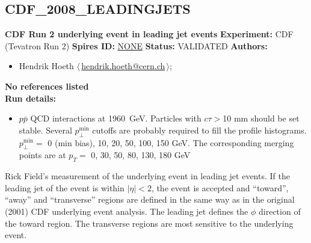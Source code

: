 \subsection{CDF\_2008\_LEADINGJETS}
\textbf{CDF Run 2 underlying event in leading jet events}\newline
\textbf{Experiment:} CDF (Tevatron Run 2) \newline
\textbf{Spires ID:} \href{http://www.slac.stanford.edu/spires/find/hep/www?rawcmd=key+NONE}{NONE}\newline
\textbf{Status:} VALIDATED\newline
\textbf{Authors:}
\begin{itemize}
  \item Hendrik Hoeth $\langle\,$\href{mailto:hendrik.hoeth@cern.ch}{hendrik.hoeth@cern.ch}$\,\rangle$;
\end{itemize}
\textbf{No references listed}\\ 
\textbf{Run details:}
\begin{itemize}

  \item $p\bar{p}$ QCD interactions at 1960~GeV. Particles with  $c \tau > {}$10 mm should be set stable. Several $p_\perp^\text{min}$  cutoffs are probably required to fill the profile histograms. $p_\perp^\text{min} = {}$ 0 (min bias), 10, 20, 50, 100, 150 GeV. The corresponding merging points are at $p_T = $ 0, 30, 50, 80,  130, 180 GeV\end{itemize}

\noindent Rick Field's measurement of the underlying event in leading jet events. If the leading jet of the event is within $|\eta| < 2$, the event is accepted and ``toward'', ``away'' and ``transverse'' regions are defined in the same way as in the original (2001) CDF underlying event analysis. The leading jet defines the $\phi$ direction of the toward region. The transverse regions are most sensitive to the underlying event.

\clearpage


\clearpage

